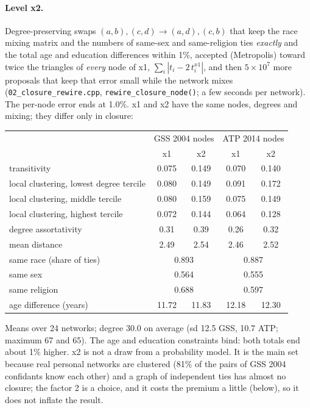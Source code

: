 \documentclass[11pt,a4paper]{article}
\newcommand{\code}[1]{\texttt{#1}}
\begin{document}
\paragraph{Level x2.} Degree-preserving swaps $(a,b),(c,d) \to (a,d),(c,b)$ that keep the
race mixing matrix and the numbers of same-sex and same-religion ties \emph{exactly} and
the total age and education differences within 1\%, accepted (Metropolis) toward twice the
triangles of \emph{every} node of x1, $\sum_i |t_i - 2\,t_i^{x1}|$, and then $5 \times
10^7$ more proposals that keep that error small while the network mixes
(\code{02\_closure\_rewire.cpp}, \code{rewire\_closure\_node()}; a few seconds per network). The
per-node error ends at 1.0\%. x1 and x2 have the same nodes, degrees and mixing; they
differ only in closure:

\begin{center}
\small
\setlength{\tabcolsep}{6pt}
\begin{tabular}{@{}lcccc@{}}
\toprule
 & \multicolumn{2}{c}{GSS 2004 nodes} & \multicolumn{2}{c}{ATP 2014 nodes} \\
 & x1 & x2 & x1 & x2 \\
\midrule
transitivity & 0.075 & 0.149 & 0.070 & 0.140 \\
local clustering, lowest degree tercile & 0.080 & 0.149 & 0.091 & 0.172 \\
local clustering, middle tercile & 0.080 & 0.159 & 0.075 & 0.149 \\
local clustering, highest tercile & 0.072 & 0.144 & 0.064 & 0.128 \\
degree assortativity & 0.31 & 0.39 & 0.26 & 0.32 \\
mean distance & 2.49 & 2.54 & 2.46 & 2.52 \\
same race (share of ties) & \multicolumn{2}{c}{0.893} & \multicolumn{2}{c}{0.887} \\
same sex & \multicolumn{2}{c}{0.564} & \multicolumn{2}{c}{0.555} \\
same religion & \multicolumn{2}{c}{0.688} & \multicolumn{2}{c}{0.597} \\
age difference (years) & 11.72 & 11.83 & 12.18 & 12.30 \\
\bottomrule
\end{tabular}
\end{center}

\noindent Means over 24 networks; degree 30.0 on average (sd 12.5 GSS, 10.7 ATP; maximum
67 and 65). The age and education constraints bind: both totals end about 1\% higher.
x2 is not a draw from a probability model. It is the main set because real personal
networks are clustered (81\% of the pairs of GSS 2004 confidants know each other) and a
graph of independent ties has almost no closure; the factor 2 is a choice, and it costs
the premium a little (below), so it does not inflate the result.
\end{document}
